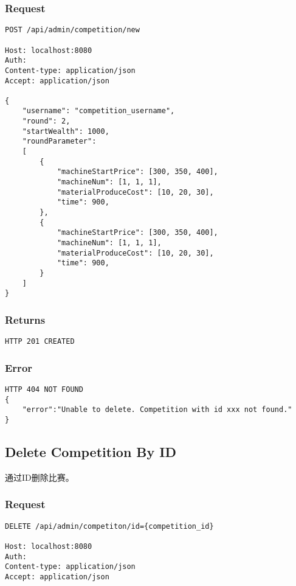 \documentclass{article}
\begin{document}
\subsubsection*{Request}
\begin{lstlisting}
POST /api/admin/competition/new

Host: localhost:8080
Auth:
Content-type: application/json
Accept: application/json

{
    "username": "competition_username",
    "round": 2,
    "startWealth": 1000,
    "roundParameter":
    [
        {
            "machineStartPrice": [300, 350, 400],
            "machineNum": [1, 1, 1],
            "materialProduceCost": [10, 20, 30],
            "time": 900,
        },
        {
            "machineStartPrice": [300, 350, 400],
            "machineNum": [1, 1, 1],
            "materialProduceCost": [10, 20, 30],
            "time": 900,
        }
    ]
}
\end{lstlisting}

\subsubsection*{Returns}
\begin{lstlisting}
HTTP 201 CREATED

\end{lstlisting}

\subsubsection*{Error}
\begin{lstlisting}
HTTP 404 NOT FOUND
{
    "error":"Unable to delete. Competition with id xxx not found."
}
\end{lstlisting}


\subsection{Delete Competition By ID}

通过ID删除比赛。

\subsubsection*{Request}
\begin{lstlisting}
DELETE /api/admin/competiton/id={competition_id}

Host: localhost:8080
Auth:
Content-type: application/json
Accept: application/json
\end{lstlisting}
\end{document}
